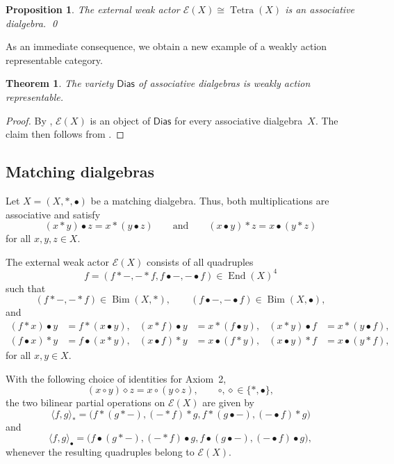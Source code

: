 \documentclass[reqno,a4paper]{amsart}
\theoremstyle{plain}
\newtheorem{theorem}[subsection]{Theorem}
\newtheorem{proposition}[subsection]{Proposition}
\theoremstyle{definition}
\theoremstyle{remark}
\numberwithin{equation}{section}
\newcommand{\noproof}{\hfil\qed}
\newcommand{\E}{\mathcal{E}}
\DeclareMathOperator{\Bim}{Bim}
\DeclareMathOperator{\End}{End}
\newcommand{\Dias}{\ensuremath{\mathsf{Dias}}}
\newcommand{\Tetra}{\operatorname{Tetra}}
\begin{document}
\begin{proposition}\cite{CasasEtAlTetra}\label{PropExternalDias}
The external weak actor $\E(X) \cong \Tetra(X)$ is an associative dialgebra. \noproof
\end{proposition}

As an immediate consequence, we obtain a new example of a weakly action representable category.

\begin{theorem}\label{TheoremDiasWRA}
The variety $\Dias$ of associative dialgebras is weakly action representable.
\end{theorem}

\begin{proof}
By , $\E(X)$ is an object of $\Dias$ for every associative dialgebra~$X$. The claim then follows from .
\end{proof}

\subsection{Matching dialgebras}\label{SecExternalMatching}

Let $X=(X,\ast,\bullet)$ be a matching dialgebra. Thus, both multiplications are associative and satisfy
\[
(x\ast y)\bullet z=x\ast(y\bullet z)
\qquad\text{and}\qquad
(x\bullet y)\ast z=x\bullet(y\ast z)
\]
for all $x,y,z\in X$.

The external weak actor $\E(X)$ consists of all quadruples
\[
f=(f\ast-,-\ast f,f\bullet-,-\bullet f)\in\End(X)^4
\]
such that
\[
(f\ast-,-\ast f)\in\Bim(X,\ast),
\qquad
(f\bullet-,-\bullet f)\in\Bim(X,\bullet),
\]
and
\begin{align*}
(f\ast x)\bullet y&=f\ast(x\bullet y), & (x\ast f)\bullet y&=x\ast(f\bullet y), & (x\ast y)\bullet f&=x\ast(y\bullet f),\\
(f\bullet x)\ast y&=f\bullet(x\ast y), & (x\bullet f)\ast y&=x\bullet(f\ast y), & (x\bullet y)\ast f&=x\bullet(y\ast f),
\end{align*}
for all $x,y\in X$.

With the following choice of identities for Axiom~2,
\[
(x\circ y)\diamond z=x\circ(y\diamond z),
\qquad
\circ,\diamond\in\{\ast,\bullet\},
\]
the two bilinear partial operations on $\E(X)$ are given by
\[
\langle f,g\rangle_\ast=
\bigl(
f\ast(g\ast-),
(-\ast f)\ast g,
f\ast(g\bullet-),
(-\bullet f)\ast g
\bigr)
\]
and
\[
\langle f,g\rangle_\bullet=
\bigl(
f\bullet(g\ast-),
(-\ast f)\bullet g,
f\bullet(g\bullet-),
(-\bullet f)\bullet g
\bigr),
\]
whenever the resulting quadruples belong to $\E(X)$.
\end{document}
